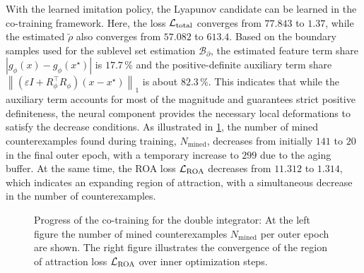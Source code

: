 With the learned imitation policy, the Lyapunov candidate can be learned in the co-training framework. 
Here, the loss $\mathcal{L}_{\mathrm{total}}$ converges from $77.843$ to $1.37$, while the estimated $\tilde{\rho}$ also converges from $57.082$ to $613.4$. 
Based on the boundary samples used for the sublevel set estimation $\mathcal{B}_{\partial}$, the estimated feature term share 
$|g_\phi(x) - g_\phi(x^\star)|$ is $17.7\,\%$ and the positive-definite auxiliary term share 
$\left\|  (\varepsilon I + R_\phi^\top R_\phi) (x - x^\star)  \right\|_1$ is about $82.3\,\%$. 
This indicates that while the auxiliary term accounts for most of the magnitude and guarantees strict positive definiteness, 
the neural component provides the necessary local deformations to satisfy the decrease conditions. 
As illustrated in \cref{fig:di-cex-roa}, the number of mined counterexamples found during training, $N_{\mathrm{mined}}$, 
decreases from initially $141$ to $20$ in the final outer epoch, with a temporary increase to $299$ due to the aging buffer.
At the same time, the ROA loss $\mathcal{L}_{\mathrm{ROA}}$ decreases from $11.312$ to $1.314$, 
which indicates an expanding region of attraction, with a simultaneous decrease in the number of counterexamples.
\begin{figure}[htbp]
    \centering
    
    \caption{Progress of the co-training for the double integrator: 
        At the left figure the number of mined counterexamples $N_{\mathrm{mined}}$ per outer epoch are shown. 
        The right figure illustrates the convergence of the region of attraction loss $\mathcal{L}_{\mathrm{ROA}}$ over inner optimization steps.}
    \label{fig:di-cex-roa}
\end{figure}

